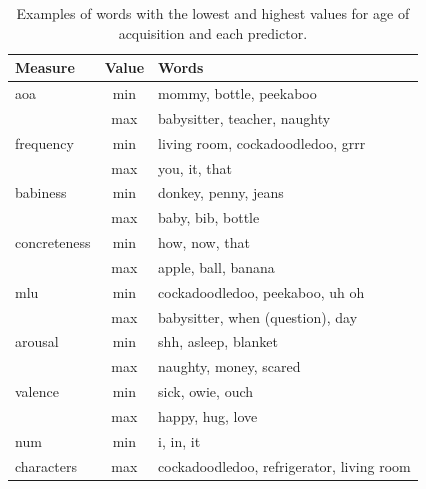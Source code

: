 \documentclass[10pt, letterpaper]{article}
\begin{document}
\setlength\tabcolsep{1pt}

\begin{table}[hb]
\centering
\begin{tabular}{lcl}
  \hline
Measure & Value & Words \\ 
  \hline
aoa & min & mommy, bottle, peekaboo \\ 
   & max & babysitter, teacher, naughty \\ 
  frequency & min & living room, cockadoodledoo, grrr \\ 
   & max & you, it, that \\ 
  babiness & min & donkey, penny, jeans \\ 
   & max & baby, bib, bottle \\ 
  concreteness & min & how, now, that \\ 
   & max & apple, ball, banana \\ 
  mlu & min & cockadoodledoo, peekaboo, uh oh \\ 
   & max & babysitter, when (question), day \\ 
  arousal & min & shh, asleep, blanket \\ 
   & max & naughty, money, scared \\ 
  valence & min & sick, owie, ouch \\ 
   & max & happy, hug, love \\ 
  num & min & i, in, it \\ 
  characters & max & cockadoodledoo, refrigerator, living room \\ 
   \hline
\end{tabular}
\caption{Examples of words with the lowest and highest values for age of acquisition and each predictor.} 
\label{tab:mytable}
\end{table}
\end{document}
